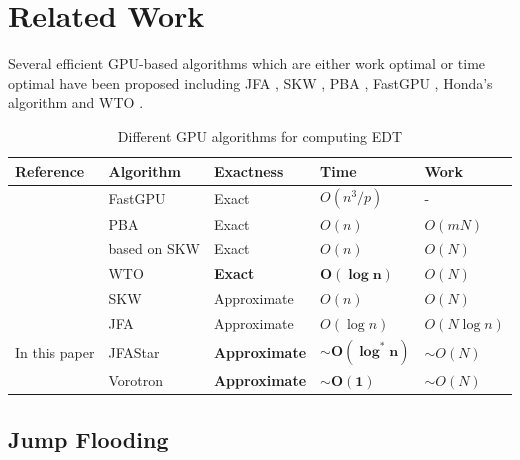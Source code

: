 \documentclass[format=acmsmall,screen,review,authordraft,nonacm]{acmart}
\newcommand{\ourjfasingle}{JFAStar}
\newcommand{\ourjfa}{Vorotron} %
\begin{document}
\section{Related Work} %

Several efficient GPU-based algorithms which are either
work optimal or time optimal have been proposed including
JFA \cite{rong2006jump}, SKW \cite{schneider2009gpu},
PBA \cite{cao2010parallel}, FastGPU \cite{de2017fast}, Honda's algorithm \cite{honda2017simple} and
WTO \cite{manduhu2019work}.

\begin{table}[H] \centering
\begin{tabular}{@{}lllll@{}}
\toprule
\textbf{Reference}                & \textbf{Algorithm}    & \textbf{Exactness}
	& \textbf{Time}         & \textbf{Work}         \\ \midrule
\citep{de2017fast}       & FastGPU      & Exact       & $O(n^3/p)$   & -            \\
\citep{cao2010parallel}  & PBA          & Exact       & $O(n)$       & $O(mN)$      \\
\citep{honda2017simple}  & based on SKW & Exact       & $O(n)$       & $O(N)$       \\
\citep{manduhu2019work}  & WTO          & \cellcolor{blue!25}\textbf{Exact}&
	\cellcolor{blue!25}$\mathbf{O(\log n)}$  & $O(N)$       \\
\citep{schneider2009gpu} & SKW          & Approximate & $O(n)$       & $O(N)$       \\
\citep{rong2006jump}     & JFA          & Approximate & $O(\log n)$  & $O(N\log n)$ \\ \bottomrule
In this paper            & \ourjfasingle&
	\cellcolor{blue!25}\textbf{Approximate} &
	\cellcolor{blue!25}$\sim$$\mathbf{O(\log^{\ast} n)}$ & $\sim$$O(N)$ \\
                         & \ourjfa      &
	\cellcolor{blue!25}\textbf{Approximate} &
	\cellcolor{blue!25}$\sim$$\mathbf{O(1)}$ & $\sim$$O(N)$ \\
\bottomrule
\end{tabular}
\vspace{1em}
\caption{Different GPU algorithms for computing EDT}
\end{table}

\subsection{Jump Flooding} %
\end{document}
